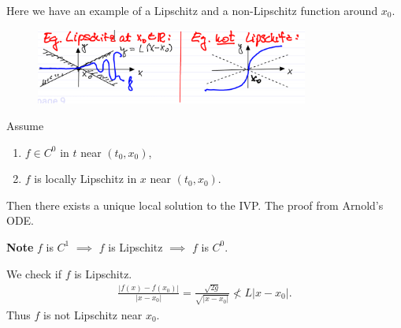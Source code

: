 \begin{ex}
	Here we have an example of a Lipschitz and a non-Lipschitz function around $x_0$.
	\begin{figure}[h]
		\centering
		\includegraphics[width=0.8\textwidth]{figures/ch1/2lipschitz.png}
	\end{figure}
\end{ex}

\begin{theorem}[Picard]
	Assume 
	\begin{enumerate}
		\item  $f \in C^0$ in $t$ near $(t_0, x_0)$,
		\item $f$ is locally Lipschitz in $x$ near $(t_0, x_0)$.
	\end{enumerate}
	Then there exists a unique local solution to the IVP. The proof from Arnold's ODE. 	
\end{theorem}
\textbf{Note} $f$ is $C^1$ $\implies$ $f $ is Lipschitz $\implies $ $f$ is $C^0$.
\begin{ex}
	We check if $f$ is Lipschitz.
	\begin{align}
		\frac{| f(x) - f(x_0) |}{|x-x_0|} = \frac{\sqrt{2g}}{\sqrt{|x-x_0|}} \not< L | x - x_0|.
	\end{align}
Thus $f$ is not Lipschitz near $x_0$.	
\end{ex}

